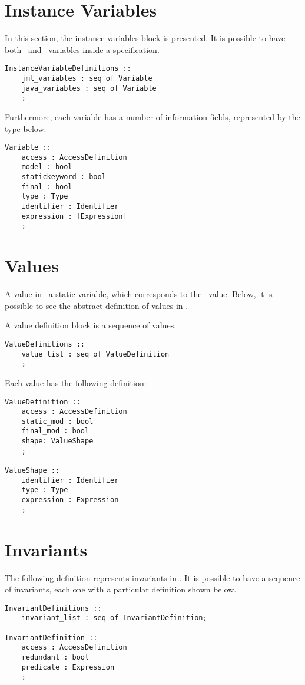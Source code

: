 \section{Instance Variables}
In this section, the instance variables block is presented. It is possible to have both \jml\ and \java\ variables inside a specification.
\medskip
\begin{lstlisting}
InstanceVariableDefinitions :: 
	jml_variables : seq of Variable
	java_variables : seq of Variable
	;
\end{lstlisting}
\medskip
Furthermore, each variable has a number of information fields, represented by the type below.
\medskip
\begin{lstlisting}
Variable ::
	access : AccessDefinition
	model : bool
	statickeyword : bool
	final : bool
	type : Type
	identifier : Identifier
	expression : [Expression]
	;
\end{lstlisting}

\section{Values}

A value in \jml\ a static variable, which corresponds to the \vpp\ value. Below, it is possible to see the abstract definition of values in \jml.

A value definition block is a sequence of values.
\medskip
\begin{lstlisting}
ValueDefinitions ::
    value_list : seq of ValueDefinition
	;
\end{lstlisting}
\medskip
Each value has the following definition:
\medskip
\begin{lstlisting}
ValueDefinition ::
	access : AccessDefinition
	static_mod : bool
	final_mod : bool
	shape: ValueShape
	;
	
ValueShape ::
	identifier : Identifier
	type : Type
	expression : Expression
	;
\end{lstlisting}

\section{Invariants}

The following definition represents invariants in \jml. It is possible to have a sequence of invariants, each one with a particular definition shown below.
\medskip
\begin{lstlisting}
InvariantDefinitions :: 
	invariant_list : seq of InvariantDefinition;

InvariantDefinition ::
	access : AccessDefinition
	redundant : bool
	predicate : Expression
	;
\end{lstlisting}

